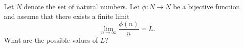 Let $ N$ denote the set of natural numbers. Let $ \phi: N\rightarrow N$ be a bijective function and assume that there exists a finite limit\[ \lim_{n\rightarrow\infty}\frac{\phi(n)}{n}=L.

\] What are the possible values of $ L$?